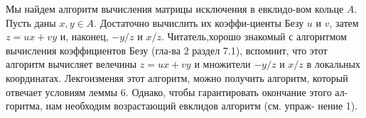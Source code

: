 \documentclass{mai_book}
\begin{document}
  Мы найдем алгоритм вычисления матрицы исключения в евклидо-\linebreak вом кольце $A$. Пусть даны $x, y \in A$. Достаточно вычислить их коэффи-\linebreak циенты Безу $u$ и $v$, затем $z=ux+vy$ и, наконец, $-y/z$ и $x/z$. Читатель,\linebreak хорошо знакомый с алгоритмом вычисления коэффициентов Безу (гла-\linebreak ва $2$ раздел 7.1), вспомнит, что этот алгоритм вычисляет велечины \linebreak $z=ux+vy$ и множители $-y/z$ и $x/z$ в локальных координатах. Лекго\linebreak изменяя этот алгоритм, можно получить алгоритм, который отвечает \linebreak условиям леммы 6. Однако, чтобы гарантировать окончание этого ал-\linebreak горитма, нам необходим возрастающий евклидов алгоритм (см. упраж- \linebreak нение 1).
\\
\\
\end{document}
